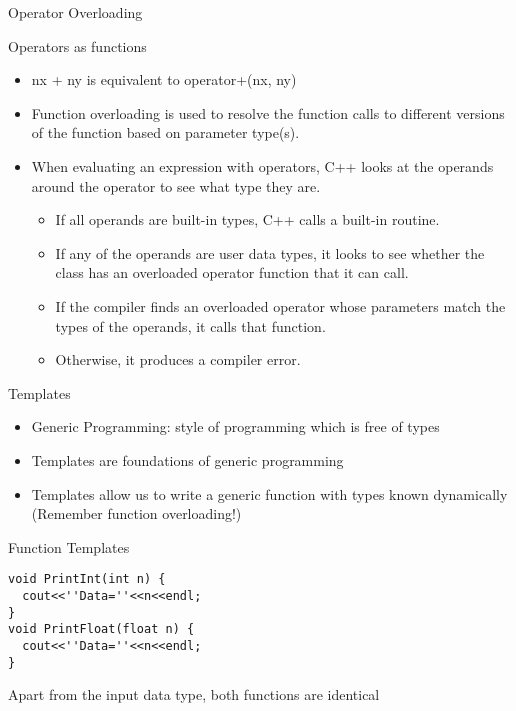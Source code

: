 \documentclass{beamer}
\begin{document}
\begin{frame}[fragile]{Operator Overloading}
  \begin{block}{Operators as functions}
    \begin{itemize}
    \item nx + ny is equivalent to operator+(nx, ny)\pause
    \item Function overloading is used to resolve the function calls to different versions of the function based on parameter type(s).\pause
    \item When evaluating an expression with operators, C++ looks at the operands around the operator to see what type they are. \pause
      \begin{itemize}
      \item If all operands are built-in types, C++ calls a built-in routine. \pause
      \item If any of the operands are user data types, it looks to see whether the class has an overloaded operator function that it can call. \pause
      \item If the compiler finds an overloaded operator whose parameters match the types of the operands, it calls that function. \pause
      \item Otherwise, it produces a compiler error.
      \end{itemize}
    \end{itemize}
  \end{block}
\end{frame}


\begin{frame}[fragile]{Templates}
  \begin{itemize}
    \item Generic Programming: style of programming which is free of types\pause
    \item Templates are foundations of generic programming\pause
    \item Templates allow us to write a generic function with types known dynamically (Remember function overloading!)
  \end{itemize}
\end{frame}

\begin{frame}[fragile]{Function Templates}
  \begin{lstlisting}
void PrintInt(int n) {
  cout<<''Data=''<<n<<endl;
}
void PrintFloat(float n) {
  cout<<''Data=''<<n<<endl;
}
  \end{lstlisting}\pause
  Apart from the input data type, both functions are identical
\end{frame}
\end{document}
